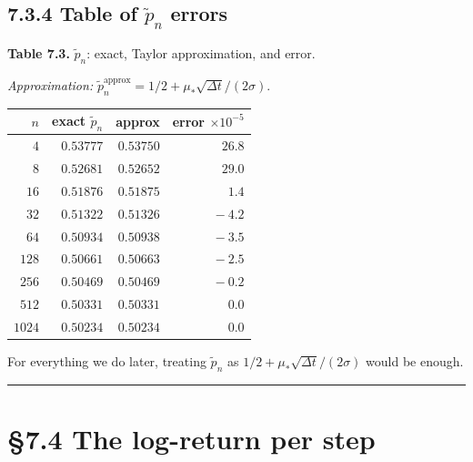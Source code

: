 \documentclass[
  10pt,
  twoside]{book}
\newcounter{none} %
\begin{document}
\subsection{\texorpdfstring{7.3.4 Table of \(\tilde p_n\)
errors}{7.3.4 Table of \textbackslash tilde p\_n errors}}\label{table-of-tilde-p_n-errors}

\textbf{Table 7.3.} \(\tilde p_n\): exact, Taylor approximation, and
error.

\emph{Approximation:}
\(\tilde p_n^{\text{approx}} = 1/2 + \mu_*\sqrt{\Delta t}/(2\sigma)\).

{\def\LTcaptype{none} %
\begin{table}[H]
\centering
\begin{tabular}{|r|r|r|r|}
\toprule
\(n\) & exact \(\tilde p_n\) & approx & error \(\times 10^{-5}\) \\
\midrule



\(\phantom{000}4\) & \(0.53777\) & \(0.53750\) & \(\phantom{-0}26.8\) \\
\(\phantom{000}8\) & \(0.52681\) & \(0.52652\) & \(\phantom{-0}29.0\) \\
\(\phantom{00}16\) & \(0.51876\) & \(0.51875\) & \(\phantom{-00}1.4\) \\
\(\phantom{00}32\) & \(0.51322\) & \(0.51326\) & \(\phantom{-0}-4.2\) \\
\(\phantom{00}64\) & \(0.50934\) & \(0.50938\) & \(\phantom{-0}-3.5\) \\
\(\phantom{0}128\) & \(0.50661\) & \(0.50663\) & \(\phantom{-0}-2.5\) \\
\(\phantom{0}256\) & \(0.50469\) & \(0.50469\) & \(\phantom{-0}-0.2\) \\
\(\phantom{0}512\) & \(0.50331\) & \(0.50331\) & \(\phantom{-00}0.0\) \\
\(1024\) & \(0.50234\) & \(0.50234\) & \(\phantom{-00}0.0\) \\
\bottomrule
\end{tabular}
\end{table}
}

For everything we do later, treating \(\tilde p_n\) as
\(1/2 + \mu_*\sqrt{\Delta t}/(2\sigma)\) would be enough.

\begin{center}\rule{0.5\linewidth}{0.5pt}\end{center}

\section{§7.4 The log-return per step}\label{the-log-return-per-step}
\end{document}
